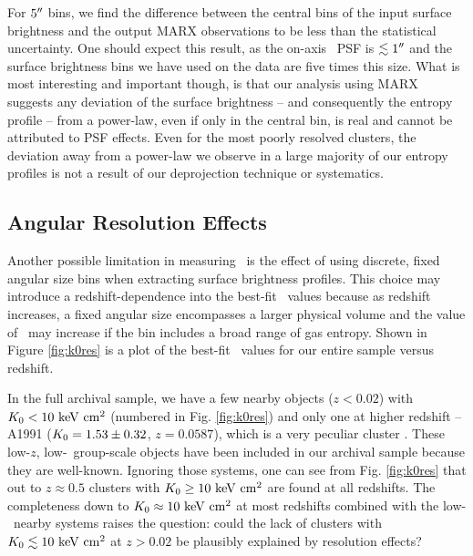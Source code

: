 \documentclass[12pt,preprint]{aastex}
\begin{document}
For $5\mathrm{^\prime}\hskip -0.1em\mathrm{^\prime}$ bins, we find the difference between the central bins of
the input surface brightness and the output MARX observations to be
less than the statistical uncertainty. One should expect this result,
as the on-axis \chandra\ PSF is $\lesssim 1\mathrm{^\prime}\hskip -0.1em\mathrm{^\prime}$ and the surface
brightness bins we have used on the data are five times this
size. What is most interesting and important though, is that our
analysis using MARX suggests any deviation of the surface brightness
-- and consequently the entropy profile -- from a power-law, even if
only in the central bin, is real and cannot be attributed to PSF
effects. Even for the most poorly resolved clusters, the deviation
away from a power-law we observe in a large majority of our entropy
profiles is not a result of our deprojection technique or systematics.

\subsection{Angular Resolution Effects}
\label{sec:angres}

Another possible limitation in measuring \kna\ is the effect of using
discrete, fixed angular size bins when extracting surface brightness
profiles. This choice may introduce a redshift-dependence into the
best-fit \kna\ values because as redshift increases, a fixed angular
size encompasses a larger physical volume and the value of \kna\ may
increase if the bin includes a broad range of gas entropy. Shown in
Figure \ref{fig:k0res} is a plot of the best-fit \kna\ values for our
entire sample versus redshift.

In the full archival sample, we have a few nearby objects ($z < 0.02$)
with $K_0 < 10 \mathrm{\mbox{\ensuremath{\mathrm{~keV}}} \mathrm{\mbox{\ensuremath{\mathrm{~cm}}}^2}}$ (numbered in Fig. \ref{fig:k0res}) and only one
at higher redshift -- A1991 ($K_0 = 1.53 \pm 0.32$, $z = 0.0587$),
which is a very peculiar cluster \citep{2004ApJ...613..180S}. These
low-$z$, low-\kna\ group-scale objects have been included in our
archival sample because they are well-known. Ignoring those systems,
one can see from Fig. \ref{fig:k0res} that out to $z \approx 0.5$
clusters with $K_0 \geq 10 \mathrm{\mbox{\ensuremath{\mathrm{~keV}}} \mathrm{\mbox{\ensuremath{\mathrm{~cm}}}^2}}$ are found at all redshifts. The
completeness down to $K_0 \approx 10 \mathrm{\mbox{\ensuremath{\mathrm{~keV}}} \mathrm{\mbox{\ensuremath{\mathrm{~cm}}}^2}}$ at most redshifts combined
with the low-\kna\ nearby systems raises the question: could the lack
of clusters with $K_0 \lesssim 10 \mathrm{\mbox{\ensuremath{\mathrm{~keV}}} \mathrm{\mbox{\ensuremath{\mathrm{~cm}}}^2}}$ at $z > 0.02$ be plausibly
explained by resolution effects?
\end{document}
